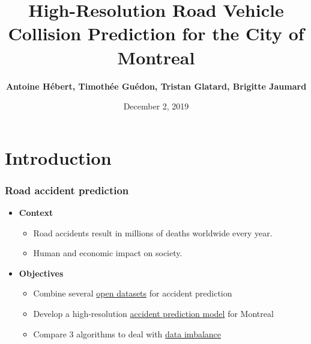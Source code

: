 \documentclass[slidestop,compress,red,mathserif]{beamer}
\title[My Title]{High-Resolution Road Vehicle Collision Prediction
for the City of Montreal}
\author[My~Name]{\small
\textbf{Antoine H\'ebert, Timoth\'ee Gu\'edon, Tristan Glatard, Brigitte Jaumard}}
\institute[My Institute/company]
{Concordia University \\ Department of Computer Science and Software Engineering}
\date[]{December 2, 2019}
\begin{document}
\begin{frame} %
\titlepage
\end{frame}

\section{Introduction}


\begin{frame}
\frametitle{Road accident prediction}

\begin{itemize}
\item[] \textbf{Context}
  \begin{itemize}
    \item Road accidents result in millions of deaths worldwide every year.
		\item Human and economic impact on society.
  \end{itemize}

\item[] \textbf{Objectives}
  \begin{itemize}
    \item Combine several \underline{open datasets} for accident prediction
    \item Develop a high-resolution \underline{accident prediction model} for Montreal
    \item Compare 3 algorithms to deal with \underline{data imbalance}
  \end{itemize}
\end{itemize}
\end{frame}

\end{document}
